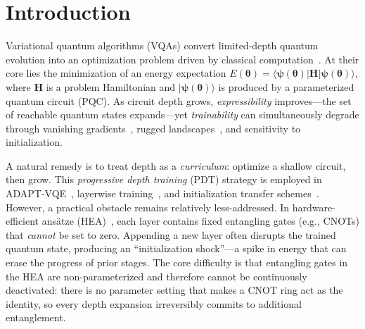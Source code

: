 \documentclass[11pt]{article}
\theoremstyle{plain}
\theoremstyle{plain}
\begin{document}
\begin{abstract}
Experiments span
six-qubit Transverse-Field Ising, Tilted Ising, and Random Ising
Hamiltonians, a broader nine-Hamiltonian benchmark, and system sizes up to $n=16$
qubits.  IP-PDT matches or outperforms
full-depth baselines on Hamiltonians whose ground states are
well-approximated by the single-entangler reachable set, with
particularly strong gains in limited-budget regimes.  At $n=16$ the
hardware-efficient baseline degrades sharply while the
single-entangler methods remain trainable.  
\end{abstract}
\section{Introduction}\label{sec:intro}
Variational quantum algorithms (VQAs) convert limited-depth quantum
evolution into an optimization problem driven by classical
computation~\cite{peruzzo2014vqe,cerezo2021vqa}.  At their core lies
the minimization of an energy expectation
$E(\bm\theta)=\langle\boldsymbol{\psi}(\bm\theta)|\mathbf{H}|\boldsymbol{\psi}(\bm\theta)\rangle$, where
$\mathbf{H}$ is a problem Hamiltonian and $|\boldsymbol{\psi}(\bm\theta)\rangle$ is produced
by a parameterized quantum circuit (PQC).  As circuit depth grows,
\emph{expressibility} improves---the set of reachable quantum states
expands---yet \emph{trainability} can simultaneously degrade through
vanishing gradients~\cite{mcclean2018barren}, rugged
landscapes~\cite{anschuetz2022beyond}, and sensitivity to
initialization.

A natural remedy is to treat depth as a \emph{curriculum}: optimize a
shallow circuit, then grow.  This \emph{progressive depth training}
(PDT) strategy is employed in ADAPT-VQE~\cite{grimsley2019adaptive},
layerwise training~\cite{skolik2021layerwise}, and initialization
transfer schemes~\cite{grant2019initialization}.  However, a practical
obstacle remains relatively less-addressed.  In hardware-efficient
ans\"atze (HEA)~\cite{kandala2017hardware}, each layer contains fixed
entangling gates (e.g., CNOTs) that \emph{cannot} be set to zero.
Appending a new layer often disrupts the trained quantum state,
producing an ``initialization shock''---a spike in energy that
can erase the progress of prior stages.
The core difficulty is that entangling gates in the HEA are
non-parameterized and therefore cannot be continuously deactivated:
there is no parameter setting that makes a CNOT ring act as the
identity, so every depth expansion irreversibly commits to additional
entanglement.
\end{document}
